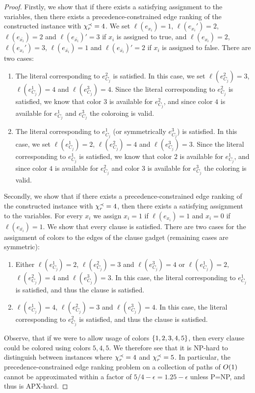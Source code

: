\begin{proof}
    

    

    Firstly, we show that if there exists a satisfying assignment to the variables, then there exists a precedence-constrained edge ranking of the constructed instance with $\chi_r^{\prec}=4$. We set $\ell(e_{x_i})=1$, $\ell(e_{x_i}')=2$, $\ell(e_{\bar{x_i}})=2$ and $\ell(e_{\bar{x_i}})'=3$ if $x_i$ is assigned to true, and $\ell(e_{x_i})=2$, $\ell(e_{x_i}')=3$, $\ell(e_{\bar{x_i}})=1$ and $\ell(e_{\bar{x_i}})'=2$ if $x_i$ is assigned to false. There are two cases:
    \begin{enumerate}
        \item The literal corresponding to $e_{C_j}^2$ is satisfied. In this case, we set $\ell(e_{C_j}^2)=3$, $\ell(e_{C_j}^1)=4$ and $\ell(e_{C_j}^3)=4$. Since the literal corresponding to $e_{C_j}^2$ is satisfied, we know that color $3$ is available for $e_{C_j}^2$, and since color $4$ is available for $e_{C_j}^1$ and $e_{C_j}^3$ the coloroing is valid.
        \item The literal corresponding to $e_{C_j}^1$ (or symmetrically $e_{C_j}^3$) is satisfied. In this case, we set $\ell(e_{C_j}^1)=2$, $\ell(e_{C_j}^2)=4$ and $\ell(e_{C_j}^3)=3$. Since the literal corresponding to $e_{C_j}^1$ is satisfied, we know that color $2$ is available for $e_{C_j}^1$, and since color $4$ is available for $e_{C_j}^2$ and color $3$ is available for $e_{C_j}^3$ the coloring is valid. 
    \end{enumerate}

    Secondly, we show that if there exists a precedence-constrained edge ranking of the constructed instance with $\chi_r^{\prec}=4$, then there exists a satisfying assignment to the variables. For every $x_i$ we assign $x_i=1$ if $\ell(e_{x_i})=1$ and $x_i=0$ if $\ell(e_{\bar{x_i}})=1$. We show that every clause is satisfied. There are two cases for the assignment of colors to the edges of the clause gadget (remaining cases are symmetric):
    \begin{enumerate}
        \item Either $\ell(e_{C_j}^1)=2$, $\ell(e_{C_j}^2)=3$ and $\ell(e_{C_j}^3)=4$ or $\ell(e_{C_j}^1)=2$, $\ell(e_{C_j}^2)=4$ and $\ell(e_{C_j}^3)=3$. In this case, the literal corresponding to $e_{C_j}^1$ is satisfied, and thus the clause is satisfied.
        \item $\ell(e_{C_j}^1)=4$, $\ell(e_{C_j}^2)=3$ and $\ell(e_{C_j}^3)=4$. In this case, the literal corresponding to $e_{C_j}^2$ is satisfied, and thus the clause is satisfied.
    \end{enumerate}

    Observe, that if we were to allow usage of colors $\mathopen{}\left\{ 1,2,3,4,5 \right\}$, then every clause could be colored using colors $5,4,5$. We therefore see that it is NP-hard to distinguish between instances where $\chi_r^{\prec}=4$ and  $\chi_r^{\prec}=5$. In particular, the precedence-constrained edge ranking problem on a collection of paths of $O\mathopen{}\left( 1 \right)$ cannot be approximated within a factor of $5/4-\epsilon=1.25-\epsilon$ unless P=NP, and thus is APX-hard.
\end{proof}

